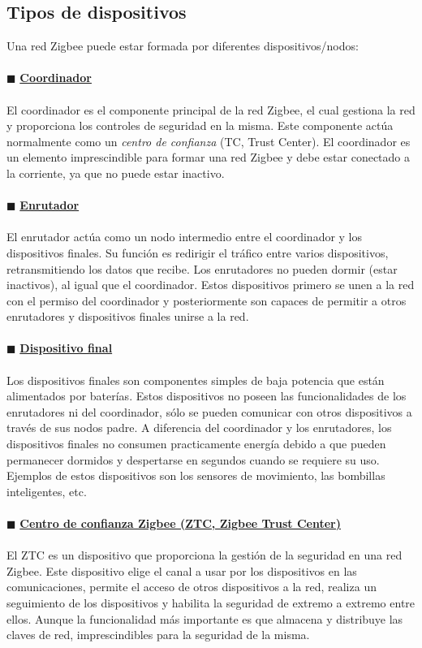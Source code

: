 \subsection{Tipos de dispositivos} %
Una red Zigbee puede estar formada por diferentes dispositivos/nodos:
\\\\$\blacksquare$ {\underline{\textbf{Coordinador}}}
\\\\El coordinador es el componente principal de la red Zigbee, el cual gestiona la red y proporciona los controles de seguridad en la misma. Este componente actúa normalmente como un {\it centro de confianza} (TC, Trust Center). El coordinador es un elemento imprescindible para formar una red Zigbee y debe estar conectado a la corriente, ya que no puede estar inactivo.
\\\\$\blacksquare$ {\underline{\textbf{Enrutador}}}
\\\\El enrutador actúa como un nodo intermedio entre el coordinador y los dispositivos finales. Su función es redirigir el tráfico entre varios dispositivos, retransmitiendo los datos que recibe. Los enrutadores no pueden dormir (estar inactivos), al igual que el coordinador. Estos dispositivos primero se unen a la red con el permiso del coordinador y posteriormente son capaces de permitir a otros enrutadores y dispositivos finales unirse a la red.
\\\\$\blacksquare$ {\underline{\textbf{Dispositivo final}}}
\\\\Los dispositivos finales son componentes simples de baja potencia que están alimentados por baterías. Estos dispositivos no poseen las funcionalidades de los enrutadores ni del coordinador, sólo se pueden comunicar con otros dispositivos a través de sus nodos padre. A diferencia del coordinador y los enrutadores, los dispositivos finales no consumen practicamente energía debido a que pueden permanecer dormidos y despertarse en segundos cuando se requiere su uso. Ejemplos de estos dispositivos son los sensores de movimiento, las bombillas inteligentes, etc. 
\\\\$\blacksquare$ {\underline{\textbf{Centro de confianza Zigbee (ZTC, Zigbee Trust Center)}}}
\\\\El ZTC es un dispositivo que proporciona la gestión de la seguridad en una red Zigbee. Este dispositivo elige el canal a usar por los dispositivos en las comunicaciones, permite el acceso de otros dispositivos a la red, realiza un seguimiento de los dispositivos y habilita la seguridad de extremo a extremo entre ellos. Aunque la funcionalidad más importante es que almacena y distribuye las claves de red, imprescindibles para la seguridad de la misma.

